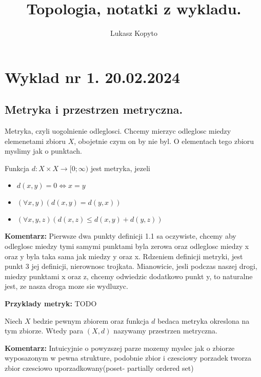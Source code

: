 \documentclass{article}
\author{Lukasz Kopyto}
\title{Topologia, notatki z wykladu.}
\begin{document}
\maketitle

\section{Wyklad nr 1. 20.02.2024}


\subsection{Metryka i przestrzen metryczna.}
Metryka, czyli uogolnienie odleglosci. Chcemy mierzyc odleglosc miedzy elemenetami zbioru $X$, obojetnie czym on by nie byl. O elementach tego zbioru myslimy jak o punktach.
\begin{tcolorbox}[colback=white!90!red,colframe=black!35!red,title=Definicja 1.1: Metryka]

    Funkcja $d: X \times X \rightarrow [0; \infty)$ jest metryka, jezeli
         \begin{itemize}
             \item $d(x,y) = 0 \iff x = y$
             \item $(\forall x,y) (d(x,y) = d(y,x))$
             \item $(\forall x,y,z) (d(x,z) \leq d(x,y) + d(y,z))$ 
         \end{itemize}
\end{tcolorbox}

\textbf{Komentarz:}
Pierwsze dwa punkty definicji 1.1 sa oczywiste, chcemy aby odleglosc miedzy tymi samymi punktami byla zerowa oraz odleglosc miedzy x oraz y byla taka sama jak miedzy y oraz x. Rdzeniem definicji metryki, jest punkt 3 jej definicji, nierownosc trojkata. Mianowicie, jesli podczas naszej drogi, miedzy punktami x oraz z, chcemy odwiedzic dodatkowo punkt y, to naturalne jest, ze nasza droga moze sie wydluzyc.  

\textbf{Przyklady metryk:}
TODO


\begin{tcolorbox}[colback=white!90!red,colframe=black!35!red,title=Definicja 1.2: Przestrzen metryczna]
    Niech $X$ bedzie pewnym zbiorem oraz funkcja $d$ bedaca metryka okreslona na tym zbiorze. Wtedy para $(X, d)$ nazywamy przestrzen metryczna. 
\end{tcolorbox}
\textbf{Komentarz:}
Intuicyjnie o powyzszej parze mozemy myslec jak o zbiorze wyposazonym w pewna strukture, podobnie zbior i czesciowy porzadek tworza zbior czesciowo uporzadkowany(poset- partially ordered set)
\end{document}
